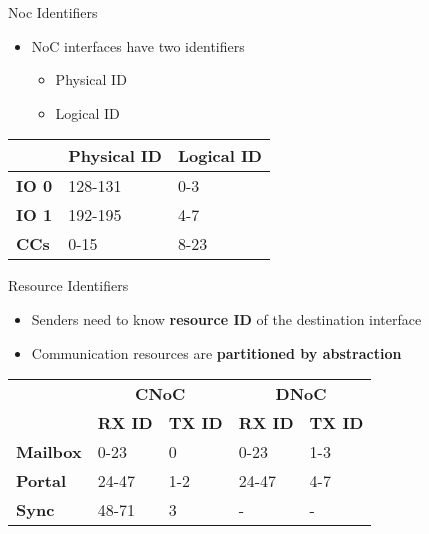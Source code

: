 		\begin{frame}[fragile]{Noc Identifiers}
			\begin{itemize}
				\item NoC interfaces have two identifiers
				\begin{itemize}
					\item Physical ID
					\item Logical ID
				\end{itemize}
			\end{itemize}

			\begin{table}
				\centering%
				\begin{tabular}{l|l|l|}
					\cline{2-3}
											            & \textbf{Physical ID} & \textbf{Logical ID} \\ \hline
					\multicolumn{1}{|l|}{\textbf{IO 0}} & 128-131              & 0-3                 \\ \hline
					\multicolumn{1}{|l|}{\textbf{IO 1}} & 192-195              & 4-7                 \\ \hline
					\multicolumn{1}{|l|}{\textbf{CCs}}  & 0-15                 & 8-23                \\ \hline
				\end{tabular}
			\end{table}
		\end{frame}

		\begin{frame}[fragile]{Resource Identifiers}
			\begin{itemize}
				\item Senders need to know \textbf{resource ID} of the destination interface
				\item Communication resources are \textbf{partitioned by abstraction}
			\end{itemize}

			\begin{table}[!tb]
				\centering%
				\begin{tabular}{l|l|l|l|l|}
					\cline{2-5}
														   & \multicolumn{2}{c|}{\textbf{CNoC}}               & \multicolumn{2}{c|}{\textbf{DNoC}}           \\ \cline{2-5}
														   & \textbf{RX ID} & \textbf{TX ID} & \textbf{RX ID} & \textbf{TX ID} \\ \hline
					\multicolumn{1}{|l|}{\textbf{Mailbox}} & 0-23           & 0              & 0-23           & 1-3            \\ \hline
					\multicolumn{1}{|l|}{\textbf{Portal}}  & 24-47          & 1-2            & 24-47          & 4-7            \\ \hline
					\multicolumn{1}{|l|}{\textbf{Sync}}    & 48-71          & 3              & -              & -              \\ \hline
				\end{tabular}
			\end{table}
		\end{frame}

